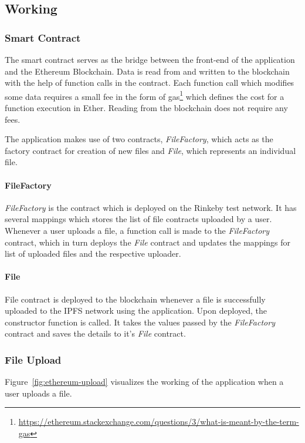 		\subsection{Working}
			\subsubsection{Smart Contract}
				The smart contract serves as the bridge between the front-end of the application and the Ethereum Blockchain. Data is read from and written to the blockchain with the help of function calls in the contract. Each function call which modifies some data requires a small fee in the form of gas\footnote{\url{https://ethereum.stackexchange.com/questions/3/what-is-meant-by-the-term-gas}} which defines the cost for a function execution in Ether. Reading from the blockchain does not require any fees.
				
				The application makes use of two contracts, \textit{FileFactory}, which acts as the factory contract for creation of new files and \textit{File}, which represents an individual file.
				
				\paragraph{FileFactory}
				\textit{FileFactory} is the contract which is deployed on the Rinkeby test network. It has several mappings which stores the list of file contracts uploaded by a user. Whenever a user uploads a file, a function call is made to the \textit{FileFactory} contract, which in turn deploys the \textit{File} contract and updates the mappings for list of uploaded files and the respective uploader.
				
				\paragraph{File}
				File contract is deployed to the blockchain whenever a file is successfully uploaded to the IPFS network using the application. Upon deployed, the constructor function is called. It takes the values passed by the \textit{FileFactory} contract and saves the details to it’s \textit{File} contract.
			
			\subsubsection{File Upload}
				Figure~\ref{fig:ethereum-upload} visualizes the working of the application when a user uploads a file.
				
